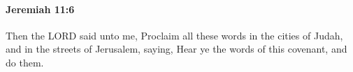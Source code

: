 
		\paragraph{Jeremiah 11:6} %
			\label{JEREMIAH-11-6}

			Then the LORD said unto me, Proclaim all these words in the cities of Judah, and in the streets of Jerusalem, saying, Hear ye the words of this covenant, and do them.


